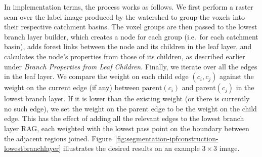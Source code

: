 In implementation terms, the process works as follows. We first perform a raster scan over the label image produced by the watershed to group the voxels into their respective catchment basins. The voxel groups are then passed to the lowest branch layer builder, which creates a node for each group (i.e.~for each catchment basin), adds forest links between the node and its children in the leaf layer, and calculates the node's properties from those of its children, as described earlier under \emph{Branch Properties from Leaf Children}. Finally, we iterate over all the edges in the leaf layer. We compare the weight on each child edge $(c_i,c_j)$ against the weight on the current edge (if any) between $\mbox{parent}(c_i)$ and $\mbox{parent}(c_j)$ in the lowest branch layer. If it is lower than the existing weight (or there is currently no such edge), we set the weight on the parent edge to be the weight on the child edge. This has the effect of adding all the relevant edges to the lowest branch layer RAG, each weighted with the lowest pass point on the boundary between the adjacent regions joined. Figure~\ref{fig:segmentation-ipfconstruction-lowestbranchlayer} illustrates the desired results on an example $3 \times 3$ image.

